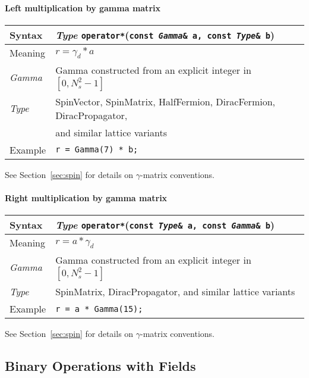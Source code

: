 \documentclass[12pt,letterpaper]{article}
\newcommand{\tHalfFermion}{HalfFermion}
\newcommand{\tDiracFermion}{DiracFermion}
\newcommand{\tDiracPropagator}{DiracPropagator}
\newcommand{\tSpinMatrix}{SpinMatrix}
\newcommand{\tSpinVector}{SpinVector}
\newcommand{\itt}{\it Type}
\begin{document}
\paragraph{Left multiplication by gamma matrix}

\begin{flushleft}
  \begin{tabular}{|l|l|}
  \hline
  Syntax      & {\it Type} \verb|operator*|({\tt const {\it Gamma}\& a, const {\it Type}\& b})\\
  \hline
  Meaning     & $r = \gamma_d * a$ \\
  \hline
  {\it Gamma} & Gamma constructed from an explicit integer in $[0,N_s^2-1]$\\
  \itt        & \tSpinVector, \tSpinMatrix, \tHalfFermion, \tDiracFermion, \tDiracPropagator, \\
              & and similar lattice variants \\
  \hline
  Example     & \verb|r = Gamma(7) * b;|\\
  \hline
  \end{tabular}
\end{flushleft}

See Section~\ref{sec:spin} for details on $\gamma$-matrix conventions.


\paragraph{Right multiplication by gamma matrix}
\begin{flushleft}
  \begin{tabular}{|l|l|}
  \hline
  Syntax      & {\it Type} \verb|operator*|({\tt const {\it Type}\& a, const {\it Gamma}\& b})\\
  \hline
  Meaning     & $r = a * \gamma_d$ \\
  \hline
  {\it Gamma} & Gamma constructed from an explicit integer in $[0,N_s^2-1]$\\
  \itt        & \tSpinMatrix, \tDiracPropagator, and similar lattice variants \\
  \hline
  Example     & \verb|r = a * Gamma(15);|\\
  \hline
  \end{tabular}
\end{flushleft}

See Section~\ref{sec:spin} for details on $\gamma$-matrix conventions.

\subsection{Binary Operations with Fields}
\end{document}
